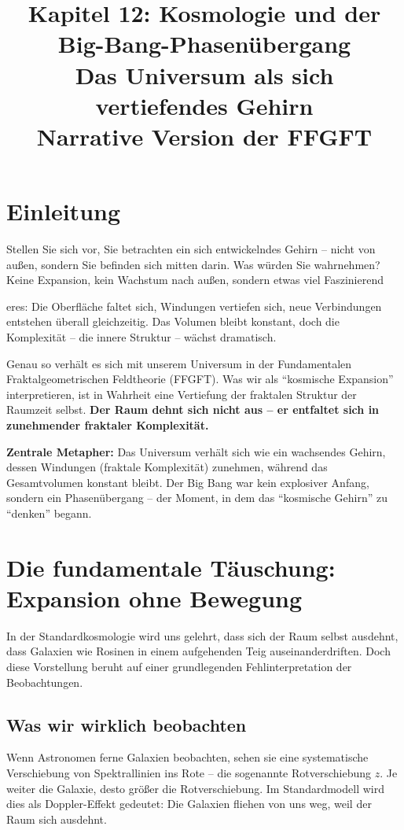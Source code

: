 \documentclass[12pt,a4paper]{article}
\title{\textbf{Kapitel 12: Kosmologie und der Big-Bang-Phasenübergang} \\
\large Das Universum als sich vertiefendes Gehirn \\
\normalsize Narrative Version der FFGFT}
\author{}
\begin{document}
\maketitle

\section*{Einleitung}

Stellen Sie sich vor, Sie betrachten ein sich entwickelndes Gehirn -- nicht von außen, sondern Sie befinden sich mitten darin. Was würden Sie wahrnehmen? Keine Expansion, kein Wachstum nach außen, sondern etwas viel Faszinierend

eres: Die Oberfläche faltet sich, Windungen vertiefen sich, neue Verbindungen entstehen überall gleichzeitig. Das Volumen bleibt konstant, doch die Komplexität -- die innere Struktur -- wächst dramatisch.

Genau so verhält es sich mit unserem Universum in der Fundamentalen Fraktalgeometrischen Feldtheorie (FFGFT). Was wir als ``kosmische Expansion'' interpretieren, ist in Wahrheit eine Vertiefung der fraktalen Struktur der Raumzeit selbst. \textbf{Der Raum dehnt sich nicht aus -- er entfaltet sich in zunehmender fraktaler Komplexität.}

\textbf{Zentrale Metapher:} Das Universum verhält sich wie ein wachsendes Gehirn, dessen Windungen (fraktale Komplexität) zunehmen, während das Gesamtvolumen konstant bleibt. Der Big Bang war kein explosiver Anfang, sondern ein Phasenübergang -- der Moment, in dem das ``kosmische Gehirn'' zu ``denken'' begann.

\section{Die fundamentale Täuschung: Expansion ohne Bewegung}

In der Standardkosmologie wird uns gelehrt, dass sich der Raum selbst ausdehnt, dass Galaxien wie Rosinen in einem aufgehenden Teig auseinanderdriften. Doch diese Vorstellung beruht auf einer grundlegenden Fehlinterpretation der Beobachtungen.

\subsection{Was wir wirklich beobachten}

Wenn Astronomen ferne Galaxien beobachten, sehen sie eine systematische Verschiebung von Spektrallinien ins Rote -- die sogenannte Rotverschiebung $z$. Je weiter die Galaxie, desto größer die Rotverschiebung. Im Standardmodell wird dies als Doppler-Effekt gedeutet: Die Galaxien fliehen von uns weg, weil der Raum sich ausdehnt.
\end{document}
